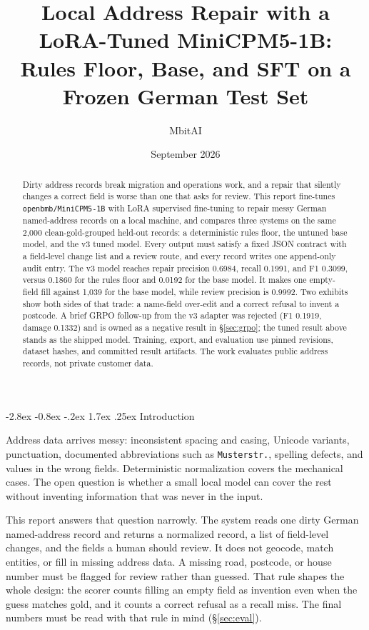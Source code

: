 \documentclass[11pt]{article}
\title{Local Address Repair with a LoRA-Tuned MiniCPM5-1B:\\
Rules Floor, Base, and SFT on a Frozen German Test Set}
\author{MbitAI}
\date{September 2026}
\makeatletter
\renewcommand\section{\@startsection{section}{1}{\z@}%
  {-2.8ex \@plus -0.8ex \@minus -.2ex}%
  {1.7ex \@plus .25ex}%
  {\normalfont\Large\bfseries}}
\makeatother
\begin{document}
\maketitle

\begin{abstract}
Dirty address records break migration and operations work, and a
repair that silently changes a correct field is worse than one that
asks for review. This report fine-tunes \texttt{openbmb/MiniCPM5-1B}
with LoRA supervised fine-tuning to repair messy German named-address
records on a local machine, and compares three systems on the same
2,000 clean-gold-grouped held-out records: a deterministic rules floor,
the untuned base model, and the v3 tuned model. Every output must
satisfy a fixed JSON contract with a field-level change list and a
review route, and every record writes one append-only audit entry. The
v3 model reaches repair precision 0.6984, recall 0.1991, and F1 0.3099,
versus 0.1860 for the rules floor and 0.0192 for the base model. It
makes one empty-field fill against 1,039 for the base model, while
review precision is 0.9992. Two exhibits show both sides of that trade:
a name-field over-edit and a correct refusal to invent a postcode.
A brief GRPO follow-up from the v3 adapter was rejected (F1 0.1919,
damage 0.1332) and is owned as a negative result in
\S\ref{sec:grpo}; the tuned result above stands as the shipped model.
Training, export, and
evaluation use pinned revisions, dataset hashes, and committed result
artifacts. The work evaluates public address records, not private
customer data.
\end{abstract}

\section{Introduction}

Address data arrives messy: inconsistent spacing and casing, Unicode
variants, punctuation, documented abbreviations such as
\texttt{Musterstr.}, spelling defects, and values in the wrong fields.
Deterministic normalization covers the mechanical cases. The open
question is whether a small local model can cover the rest without
inventing information that was never in the input.

This report answers that question narrowly. The system reads one dirty
German named-address record and returns a normalized record, a list of
field-level changes, and the fields a human should review. It does not
geocode, match entities, or fill in missing address data. A missing
road, postcode, or house number must be flagged for review rather than
guessed. That rule shapes the whole design: the scorer counts filling
an empty field as invention even when the guess matches gold, and it
counts a correct refusal as a recall miss. The final numbers must be
read with that rule in mind (\S\ref{sec:eval}).
\end{document}
